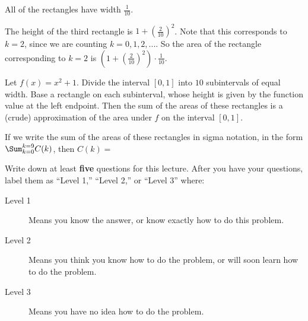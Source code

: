 \documentclass{ximera}
\begin{document}
\begin{question}
  \begin{hint}
    All of the rectangles have width $\frac{1}{10}$.
  \end{hint}
  \begin{hint}
    The height of the third rectangle is $1+(\frac{2}{10})^2$.  Note that this corresponds to $k=2$, since we are counting $k=0,1,2,...$.  So the area of the rectangle corresponding to $k=2$ is $(1+(\frac{2}{10})^2) \cdot \frac{1}{10}$.
  \end{hint}
  Let $f(x) = x^2+1$.  Divide the interval $[0,1]$ into $10$ subintervals of equal width.  Base a rectangle on each subinterval, whose height is given by the function value at the left endpoint.  Then the sum of the areas of these rectangles is a (crude) approximation of the area under $f$ on the interval $[0,1]$.
	
	
  If we write the sum of the areas of these rectangles in sigma notation, in the form $\Sum_{k=0}^{k=9} C(k)$, then $C(k) = $
\end{question}


\begin{question}
Write down at least \textbf{five} questions for this lecture. After
you have your questions, label them as ``Level 1,'' ``Level 2,'' or ``Level 3'' where:
\begin{description}
\item[Level 1] Means you know the answer, or know exactly how to do this problem.
\item[Level 2] Means you think you know how to do the problem, or will soon learn how to do the problem.
\item[Level 3] Means you have no idea how to do the problem. 
\end{description}
  \begin{freeResponse}
  \end{freeResponse}
\end{question}
\end{document}

